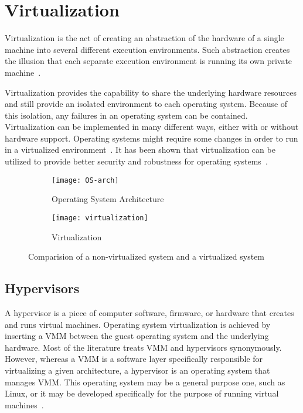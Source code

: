 \section{Virtualization}

Virtualization is the act of creating an abstraction of the hardware of a single machine into several different execution environments. Such abstraction creates the illusion that each separate execution environment is running its own private machine~\cite{Galvin}. 

Virtualization provides the capability to share the underlying hardware resources and still provide an isolated environment to each operating system. Because of this isolation, any failures in an operating system can be contained. Virtualization can be implemented in many different ways, either with or without hardware support. Operating systems might require some changes in order to run in a virtualized environment~\cite{Drepper:2008:CV:1348583.1348591}. It has been shown that virtualization can be utilized to provide better security and robustness for operating systems~\cite{Fraser04safehardware, LeVasseur04UnmodifiedDriverReuse, Riley:2008:GPK:1433006.1433008}.
\begin{figure}[!ht]
    \centering
    \begin{subfigure}[b]{0.49\textwidth}
	\texttt{[image: OS-arch]}
	\caption{Operating System Architecture}
	\label{fig:OS}
    \end{subfigure}
	\hfill
    \begin{subfigure}[b]{0.49\textwidth}
	\texttt{[image: virtualization]}
	\caption{Virtualization}
	\label{fig:Virtualization}
	\end{subfigure}
    \caption{Comparision of a non-virtualized system and a virtualized system}\label{fig:Kernel space}
\end{figure}

\subsection{Hypervisors}
A hypervisor is a piece of computer software, firmware, or hardware that creates and runs virtual machines. Operating system virtualization is achieved by inserting a VMM between the guest operating system and the underlying hardware. Most of the literature treats VMM and hypervisors synonymously. However, whereas a VMM is a software layer specifically responsible for virtualizing a given architecture, a hypervisor is an operating system that manages VMM. This operating system may be a general purpose one, such as Linux, or it may be developed specifically for the purpose of running virtual machines~\cite{Agesen:2010:EXV:1899928.1899930}.

